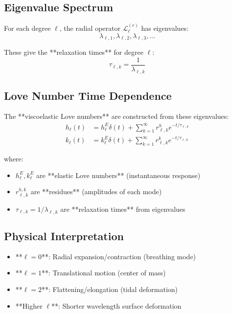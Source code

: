 \documentclass{article}
\begin{document}
\subsection{Eigenvalue Spectrum}

For each degree $\ell$, the radial operator $\mathcal{L}_\ell^{(r)}$ has eigenvalues:
\begin{equation}
\lambda_{\ell,1}, \lambda_{\ell,2}, \lambda_{\ell,3}, \ldots
\end{equation}

These give the **relaxation times** for degree $\ell$:
\begin{equation}
\tau_{\ell,k} = \frac{1}{\lambda_{\ell,k}}
\end{equation}

\subsection{Love Number Time Dependence}

The **viscoelastic Love numbers** are constructed from these eigenvalues:
\begin{align}
h_\ell(t) &= h_\ell^E \delta(t) + \sum_{k=1}^{\infty} r_{\ell,k}^h e^{-t/\tau_{\ell,k}} \\
k_\ell(t) &= k_\ell^E \delta(t) + \sum_{k=1}^{\infty} r_{\ell,k}^k e^{-t/\tau_{\ell,k}}
\end{align}

where:
\begin{itemize}
\item $h_\ell^E, k_\ell^E$ are **elastic Love numbers** (instantaneous response)
\item $r_{\ell,k}^{h,k}$ are **residues** (amplitudes of each mode)
\item $\tau_{\ell,k} = 1/\lambda_{\ell,k}$ are **relaxation times** from eigenvalues
\end{itemize}

\subsection{Physical Interpretation}

\begin{itemize}
\item **$\ell = 0$**: Radial expansion/contraction (breathing mode)
\item **$\ell = 1$**: Translational motion (center of mass)
\item **$\ell = 2$**: Flattening/elongation (tidal deformation)
\item **Higher $\ell$**: Shorter wavelength surface deformation
\end{itemize}
\end{document}
